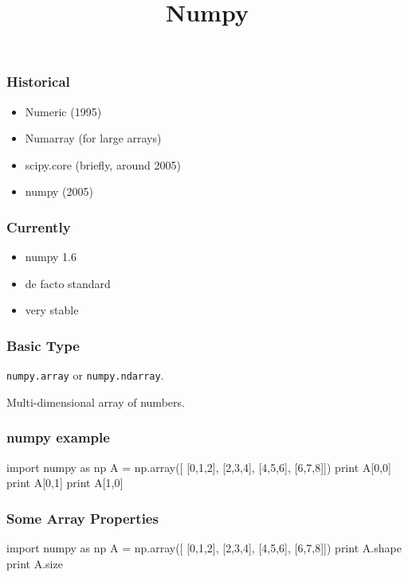 
\title{Numpy}

\frame{\maketitle}

\begin{frame}[fragile]

\frametitle{Historical}

\begin{itemize}
\item Numeric (1995)
\item Numarray (for large arrays)
\item scipy.core (briefly, around 2005)
\item numpy (2005)
\end{itemize}
\end{frame}

\begin{frame}[fragile]
\frametitle{Currently}
\begin{itemize}
\item numpy 1.6
\item \alert{de facto} standard
\item very stable
\end{itemize}
\end{frame}

\begin{frame}[fragile]
\frametitle{Basic Type}

\lstinline{numpy.array} or \lstinline{numpy.ndarray}.

\bigskip
Multi-dimensional array of numbers.

\end{frame}

\begin{frame}[fragile]
\frametitle{numpy example}

\begin{python}
import numpy as np
A = np.array([
    [0,1,2],
    [2,3,4],
    [4,5,6],
    [6,7,8]])
print A[0,0]
print A[0,1]
print A[1,0]
\end{python}

\end{frame}

\begin{frame}[fragile]
\frametitle{Some Array Properties}

\begin{python}
import numpy as np
A = np.array([
    [0,1,2],
    [2,3,4],
    [4,5,6],
    [6,7,8]])
print A.shape
print A.size
\end{python}
\end{frame}

